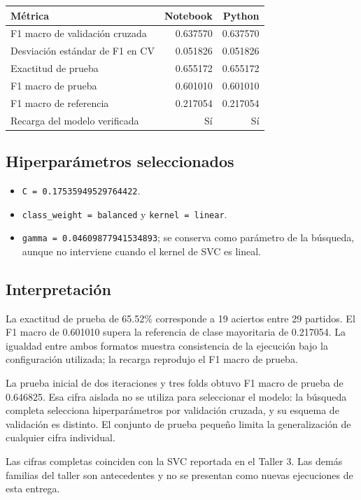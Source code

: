 \documentclass[12pt,a4paper]{article}
\begin{document}
\renewcommand{\arraystretch}{1.22}
\noindent\begin{tabular}{@{}lrr@{}}
\toprule
\textbf{Métrica} & \textbf{Notebook} & \textbf{Python}\\
\midrule
F1 macro de validación cruzada & 0.637570 & 0.637570\\
Desviación estándar de F1 en CV & 0.051826 & 0.051826\\
Exactitud de prueba & 0.655172 & 0.655172\\
F1 macro de prueba & 0.601010 & 0.601010\\
F1 macro de referencia & 0.217054 & 0.217054\\
Recarga del modelo verificada & Sí & Sí\\
\bottomrule
\end{tabular}

\subsection{Hiperparámetros seleccionados}
\begin{itemize}
\item \texttt{C = 0.17535949529764422}.
\item \texttt{class\_weight = balanced} y \texttt{kernel = linear}.
\item \texttt{gamma = 0.04609877941534893}; se conserva como parámetro de la búsqueda, aunque no interviene cuando el kernel de SVC es lineal.
\end{itemize}

\subsection{Interpretación}
La exactitud de prueba de 65.52\% corresponde a 19 aciertos entre 29 partidos. El F1 macro de 0.601010 supera la referencia de clase mayoritaria de 0.217054. La igualdad entre ambos formatos muestra consistencia de la ejecución bajo la configuración utilizada; la recarga reprodujo el F1 macro de prueba.

La prueba inicial de dos iteraciones y tres folds obtuvo F1 macro de prueba de 0.646825. Esa cifra aislada no se utiliza para seleccionar el modelo: la búsqueda completa selecciona hiperparámetros por validación cruzada, y su esquema de validación es distinto. El conjunto de prueba pequeño limita la generalización de cualquier cifra individual.

Las cifras completas coinciden con la SVC reportada en el Taller 3. Las demás familias del taller son antecedentes y no se presentan como nuevas ejecuciones de esta entrega.
\end{document}
